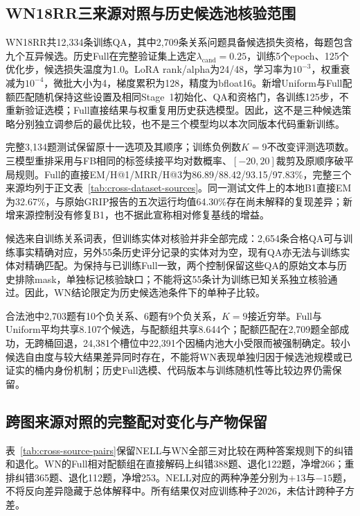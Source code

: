 \subsection{WN18RR三来源对照与历史候选池核验范围}
\label{sec:wn-exploratory}

WN18RR共12,334条训练QA，其中2,709条关系问题具备候选损失资格，每题包含九个互异候选。历史Full在完整验证集上选定$\lambda_{\mathrm{cand}}=0.25$，训练5个epoch、125个优化步，候选损失温度为1.0。LoRA rank/alpha为24/48，学习率为$10^{-3}$，权重衰减为$10^{-4}$，微批大小为4，梯度累积为128，精度为bfloat16。新增Uniform与Full配额匹配随机保持这些设置及相同Stage~1初始化、QA和资格门，各训练125步，不重新验证选模；Full直接结果与权重复用历史获选模型。因此，这不是三种候选策略分别独立调参后的最优比较，也不是三个模型均以本次同版本代码重新训练。

完整3,134题测试保留原十一选项及其顺序；训练负例数$K=9$不改变评测选项数。三模型重排采用与FB相同的标签续接平均对数概率、$[-20,20]$裁剪及原顺序破平局规则。Full的直接EM/H@1/MRR/H@3为86.89/88.42/93.15/97.83\%，完整三个来源均列于正文表~\ref{tab:cross-dataset-sources}。同一测试文件上的本地B1直接EM为32.67\%，与原始GRIP报告的五次运行均值64.30\%存在尚未解释的复现差异\citep{feng2026grip}；新增来源控制没有修复B1，也不据此宣称相对修复基线的增益。

候选来自训练关系词表，但训练实体对核验并非全部完成：2,654条合格QA可与训练事实精确对应，另外55条历史评分记录的实体对为空，现有QA亦无法与训练实体对精确匹配。为保持与已训练Full一致，两个控制保留这些QA的原始文本与历史排除mask，单独标记核验缺口；不能将这55条计为训练已知关系独立核验通过。因此，WN结论限定为历史候选池条件下的单种子比较。

合法池中2,703题有10个负关系、6题有9个负关系，$K=9$接近穷举。Full与Uniform平均共享8.107个候选，与配额组共享8.644个；配额匹配在2,709题全部成功，无跨桶回退，24,381个槽位中22,391个因桶内池大小受限而被强制确定。较小候选自由度与较大结果差异同时存在，不能将WN表现单独归因于候选池规模或已证实的桶内身份机制；历史Full选模、代码版本与训练随机性等比较边界仍需保留。

\subsection{跨图来源对照的完整配对变化与产物保留}
\label{sec:cross-source-pairs}

表~\ref{tab:cross-source-pairs}保留NELL与WN全部三对比较在两种答案规则下的纠错和退化。WN的Full相对配额组在直接解码上纠错388题、退化122题，净增266；重排纠错365题、退化112题，净增253。NELL对应的两种净差分别为$+13$与$-15$题，不将反向差异隐藏于总体解释中。所有结果仅对应训练种子2026，未估计跨种子方差。


